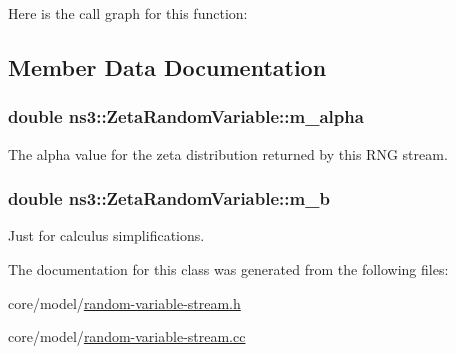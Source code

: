Here is the call graph for this function\+:




\subsection{Member Data Documentation}
\subsubsection[{\texorpdfstring{m\+\_\+alpha}{m_alpha}}]{\setlength{\rightskip}{0pt plus 5cm}double ns3\+::\+Zeta\+Random\+Variable\+::m\+\_\+alpha\hspace{0.3cm}{\ttfamily [private]}}\hypertarget{classns3_1_1ZetaRandomVariable_a48ec2fea5e04864918b734f5ca4e5e07}{}\label{classns3_1_1ZetaRandomVariable_a48ec2fea5e04864918b734f5ca4e5e07}
The alpha value for the zeta distribution returned by this R\+NG stream. 
\subsubsection[{\texorpdfstring{m\+\_\+b}{m_b}}]{\setlength{\rightskip}{0pt plus 5cm}double ns3\+::\+Zeta\+Random\+Variable\+::m\+\_\+b\hspace{0.3cm}{\ttfamily [private]}}\hypertarget{classns3_1_1ZetaRandomVariable_af07c02d30a8e7ffd8386b8776ef7b3ec}{}\label{classns3_1_1ZetaRandomVariable_af07c02d30a8e7ffd8386b8776ef7b3ec}
Just for calculus simplifications. 

The documentation for this class was generated from the following files\+:\begin{DoxyCompactItemize}
\item 
core/model/\hyperlink{random-variable-stream_8h}{random-\/variable-\/stream.\+h}\item 
core/model/\hyperlink{random-variable-stream_8cc}{random-\/variable-\/stream.\+cc}\end{DoxyCompactItemize}

